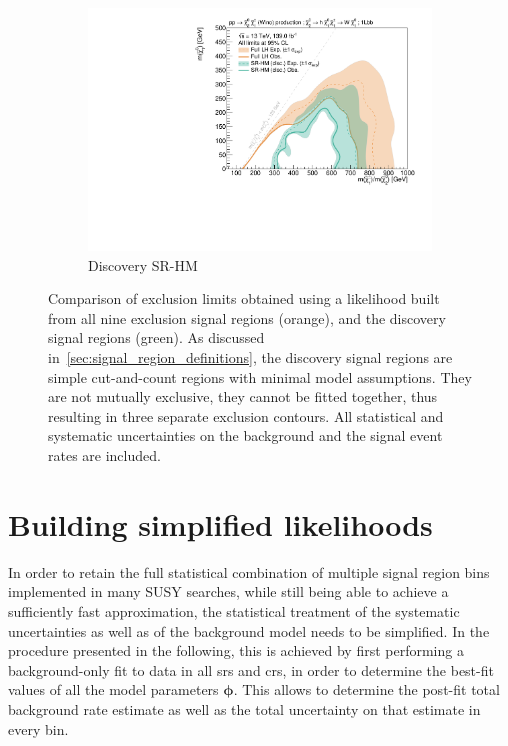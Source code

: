 \begin{figure}
\begin{subfigure}[b]{0.5\textwidth}
		\centering\includegraphics[width=\textwidth]{exclusion_1Lbb_SRHM_noLabel}
		\caption{Discovery SR-HM\label{fig:single_bin_SRHM}}
	\end{subfigure}%
	\caption{Comparison of exclusion limits obtained using a likelihood built from all nine exclusion signal regions (orange), and the discovery signal regions (green). As discussed in~\cref{sec:signal_region_definitions}, the discovery signal regions are simple cut-and-count regions with minimal model assumptions. They are not mutually exclusive, they cannot be fitted together, thus resulting in three separate exclusion contours. All statistical and systematic uncertainties on the background and the signal event rates are included.}\label{fig:single_bin}
\end{figure}

\section{Building simplified likelihoods}\label{sec:building_simplified_likelihoods}



In order to retain the full statistical combination of multiple signal region bins implemented in many SUSY searches, while still being able to achieve a sufficiently fast approximation, the statistical treatment of the systematic uncertainties as well as of the background model needs to be simplified. In the procedure presented in the following, this is achieved by first performing a background-only fit to data in all \glspl{sr} and \glspl{cr}, in order to determine the best-fit values of all the model parameters $\boldsymbol{\phi}$. This allows to determine the post-fit total background rate estimate as well as the total uncertainty on that estimate in every bin. 

